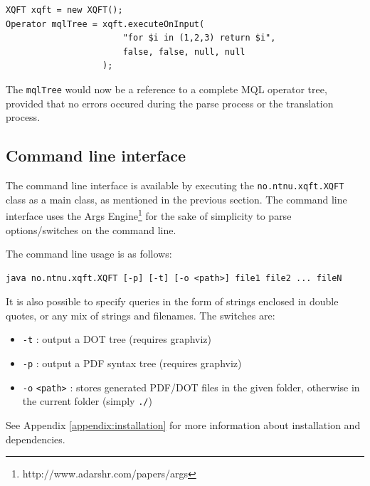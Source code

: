 \begin{Verbatim}
XQFT xqft = new XQFT();
Operator mqlTree = xqft.executeOnInput(
                       "for $i in (1,2,3) return $i", 
                       false, false, null, null
                   );
\end{Verbatim}

The \texttt{mqlTree} would now be a reference to a complete MQL operator tree,
provided that no errors occured during the parse process or the translation
process.

\subsection{Command line interface}
\label{sect:impl:system:cli}
The command line interface is available by executing the
\texttt{no.ntnu.xqft.XQFT} class as a main class, as mentioned in the previous
section. The command line interface uses the Args
Engine\footnote{http://www.adarshr.com/papers/args} for the sake of simplicity
to parse options/switches on the command line. 

The command line usage is as follows:

\begin{verbatim}
java no.ntnu.xqft.XQFT [-p] [-t] [-o <path>] file1 file2 ... fileN
\end{verbatim}

It is also possible to specify queries in the form of strings enclosed in
double quotes, or any mix of strings and filenames. The switches are:
\begin{itemize}
  \item \texttt{-t} : output a DOT tree (requires graphviz)
  \item \texttt{-p} : output a PDF syntax tree (requires graphviz)
  \item \texttt{-o} \texttt{<path>} : stores generated PDF/DOT files in the given folder, 
  otherwise in the current folder (simply \texttt{./})
\end{itemize}

See Appendix \ref{appendix:installation} for more information about installation and
dependencies.
